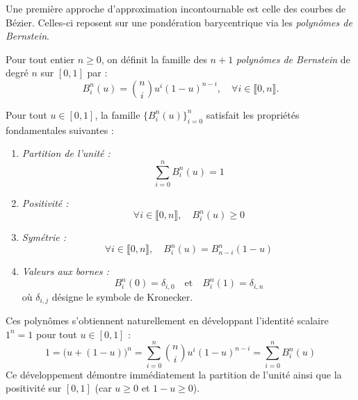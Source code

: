 Une première approche d'approximation incontournable est celle des courbes de Bézier. Celles-ci reposent sur une pondération barycentrique via les \emph{polynômes de Bernstein}.

\begin{definition}
    Pour tout entier $n \geqslant 0$, on définit la famille des $n+1$ \emph{polynômes de Bernstein} de degré $n$ sur $[0, 1]$ par :
    \begin{equation}
        B_i^n(u) = \binom{n}{i} u^i (1 - u)^{n-i}, \quad \forall i \in \llbracket 0, n \rrbracket.
    \end{equation}
\end{definition}

\begin{prop}
    Pour tout $u \in [0, 1]$, la famille $\{B_i^n(u)\}_{i=0}^n$ satisfait les propriétés fondamentales suivantes :
    \begin{enumerate}
        \item \emph{Partition de l'unité :}
        \begin{equation}
            \sum_{i=0}^n B_i^n(u) = 1
        \end{equation}
        \item \emph{Positivité :}
        \begin{equation}
            \forall i \in \llbracket 0, n \rrbracket, \quad B_i^n(u) \ge 0
        \end{equation}
        \item \emph{Symétrie :}
        \begin{equation}
            \forall i \in \llbracket 0, n \rrbracket, \quad B_i^n(u) = B_{n-i}^n(1 - u)
        \end{equation}
        \item \emph{Valeurs aux bornes :}
        \begin{equation}
            B_i^n(0) = \delta_{i, 0} \quad \text{et} \quad B_i^n(1) = \delta_{i, n}
        \end{equation}
        où $\delta_{i, j}$ désigne le symbole de Kronecker.
    \end{enumerate}
\end{prop}

\begin{remark}
    Ces polynômes s'obtiennent naturellement en développant l'identité scalaire $1^n = 1$ pour tout $u \in [0, 1]$ :
    \begin{equation}
        1 = \big(u + (1 - u)\big)^n = \sum_{i=0}^n \binom{n}{i} u^i (1 - u)^{n-i} = \sum_{i=0}^n B_i^n(u)
    \end{equation}
    Ce développement démontre immédiatement la partition de l'unité ainsi que la positivité sur $[0, 1]$ (car $u \geqslant 0$ et $1-u \geqslant 0$).
\end{remark}

